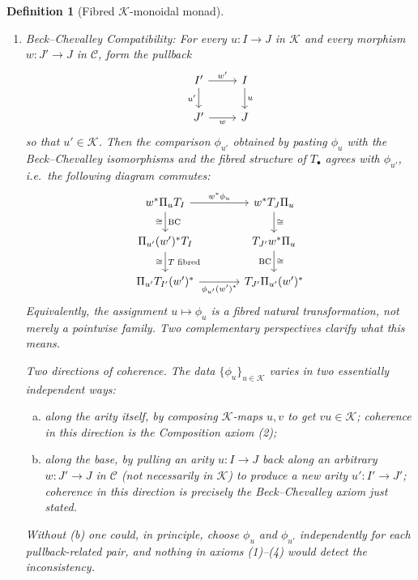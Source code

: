 \documentclass{article}
\newtheorem{definition}{Definition}
\begin{document}
\begin{definition}[Fibred $\mathcal{K}$-monoidal monad]
\begin{enumerate}
    \item \emph{Beck--Chevalley Compatibility:} For every $u : I \to J$ in $\mathcal{K}$ and every morphism $w : J' \to J$ in $\mathcal{C}$, form the pullback
    \[\begin{tikzcd}
    {I'} & I \\
    {J'} & J
    \arrow["{w'}", from=1-1, to=1-2]
    \arrow["{u'}"', from=1-1, to=2-1]
    \arrow["u", from=1-2, to=2-2]
    \arrow["w"', from=2-1, to=2-2]
    \end{tikzcd}\]
    so that $u' \in \mathcal{K}$. Then the comparison $\phi_{u'}$ obtained by pasting $\phi_u$ with the Beck--Chevalley isomorphisms and the fibred structure of $T_\bullet$ agrees with $\phi_{u'}$, i.e.\ the following diagram commutes:
    \[\begin{tikzcd}[column sep=large]
    {w^* \Pi_u T_I} & {w^* T_J \Pi_u} \\
    {\Pi_{u'} (w')^* T_I} & {T_{J'} w^* \Pi_u} \\
    {\Pi_{u'} T_{I'} (w')^*} & {T_{J'} \Pi_{u'} (w')^*}
    \arrow["{w^* \phi_u}", from=1-1, to=1-2]
    \arrow["\cong"', "\mathrm{BC}", from=1-1, to=2-1]
    \arrow["\cong", from=1-2, to=2-2]
    \arrow["\cong"', "T\text{ fibred}", from=2-1, to=3-1]
    \arrow["\cong", "\mathrm{BC}"', from=2-2, to=3-2]
    \arrow["{\phi_{u'} (w')^*}"', from=3-1, to=3-2]
    \end{tikzcd}\]
    Equivalently, the assignment $u \mapsto \phi_u$ is a \emph{fibred} natural transformation, not merely a pointwise family. Two complementary perspectives clarify what this means.

    \smallskip
    \noindent \emph{Two directions of coherence.} The data $\{\phi_u\}_{u \in \mathcal{K}}$ varies in two essentially independent ways:
    \begin{enumerate}[(a)]
        \item along the arity itself, by composing $\mathcal{K}$-maps $u, v$ to get $vu \in \mathcal{K}$; coherence in this direction is the Composition axiom (2);
        \item along the base, by pulling an arity $u : I \to J$ back along an arbitrary $w : J' \to J$ in $\mathcal{C}$ (not necessarily in $\mathcal{K}$) to produce a new arity $u' : I' \to J'$; coherence in this direction is precisely the Beck--Chevalley axiom just stated.
    \end{enumerate}
    Without (b) one could, in principle, choose $\phi_u$ and $\phi_{u'}$ independently for each pullback-related pair, and nothing in axioms (1)--(4) would detect the inconsistency.


\end{enumerate}
\end{definition}
\end{document}
